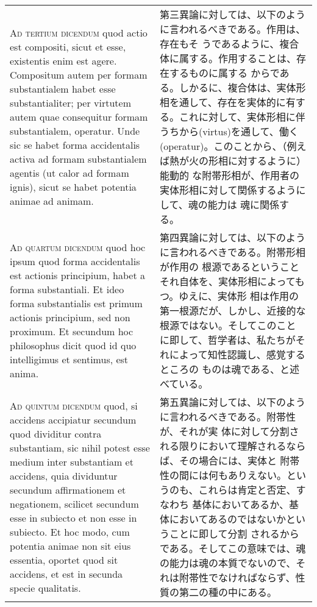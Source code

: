 \documentclass[paper=a4paper,fontsize=10pt,jafontsize=9pt,titlepage]{jlreq}
\begin{document}
\begin{longtable}{p{21em}p{21em}}
\\



{\scshape Ad tertium dicendum} quod actio est compositi, sicut et
esse, existentis enim est agere. Compositum autem per formam
substantialem habet esse substantialiter; per virtutem autem quae
consequitur formam substantialem, operatur. Unde sic se habet forma
accidentalis activa ad formam substantialem agentis (ut calor ad
formam ignis), sicut se habet potentia animae ad animam.

&

 第三異論に対しては、以下のように言われるべきである。作用は、存在もそ
 うであるように、複合体に属する。作用することは、存在するものに属する
 からである。しかるに、複合体は、実体形相を通して、存在を実体的に有す
 る。これに対して、実体形相に伴うちから(virtus)を通して、働く
 (operatur)。このことから、（例えば熱が火の形相に対するように）能動的
 な附帯形相が、作用者の実体形相に対して関係するようにして、魂の能力は
 魂に関係する。

\\



{\scshape Ad quartum dicendum} quod hoc ipsum quod forma accidentalis
est actionis principium, habet a forma substantiali. Et ideo forma
substantialis est primum actionis principium, sed non proximum. Et
secundum hoc philosophus dicit quod id quo intelligimus et sentimus,
est anima.


&

 第四異論に対しては、以下のように言われるべきである。附帯形相が作用の
 根源であるということそれ自体を、実体形相によってもつ。ゆえに、実体形
 相は作用の第一根源だが、しかし、近接的な根源ではない。そしてこのこと
 に即して、哲学者は、私たちがそれによって知性認識し、感覚するところの
 ものは魂である、と述べている。

\\


{\scshape Ad quintum dicendum} quod, si accidens accipiatur secundum
quod dividitur contra substantiam, sic nihil potest esse medium inter
substantiam et accidens, quia dividuntur secundum affirmationem et
negationem, scilicet secundum esse in subiecto et non esse in
subiecto. Et hoc modo, cum potentia animae non sit eius essentia,
oportet quod sit accidens, et est in secunda specie qualitatis.

&

第五異論に対しては、以下のように言われるべきである。附帯性が、それが実
体に対して分割される限りにおいて理解されるならば、その場合には、実体と
附帯性の間には何もありえない。というのも、これらは肯定と否定、すなわち
基体においてあるか、基体においてあるのではないかということに即して分割
されるからである。そしてこの意味では、魂の能力は魂の本質でないので、そ
れは附帯性でなければならず、性質の第二の種の中にある。


\end{longtable}
\end{document}
